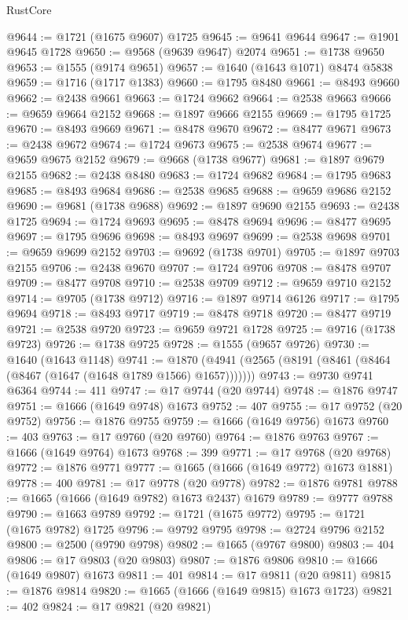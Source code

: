 \begin{lexlean}{RustCore}
\begin{coremodule}
@9644 := @1721 (@1675 @9607) @1725
@9645 := @9641 @9644
@9647 := @1901 @9645 @1728
@9650 := @9568 (@9639 @9647) @2074
@9651 := @1738 @9650
@9653 := @1555 (@9174 @9651)
@9657 := @1640 (@1643 @1071) @8474 @5838
@9659 := @1716 (@1717 @1383)
@9660 := @1795 @8480
@9661 := @8493 @9660
@9662 := @2438 @9661
@9663 := @1724 @9662
@9664 := @2538 @9663
@9666 := @9659 @9664 @2152
@9668 := @1897 @9666 @2155
@9669 := @1795 @1725
@9670 := @8493 @9669
@9671 := @8478 @9670
@9672 := @8477 @9671
@9673 := @2438 @9672
@9674 := @1724 @9673
@9675 := @2538 @9674
@9677 := @9659 @9675 @2152
@9679 := @9668 (@1738 @9677)
@9681 := @1897 @9679 @2155
@9682 := @2438 @8480
@9683 := @1724 @9682
@9684 := @1795 @9683
@9685 := @8493 @9684
@9686 := @2538 @9685
@9688 := @9659 @9686 @2152
@9690 := @9681 (@1738 @9688)
@9692 := @1897 @9690 @2155
@9693 := @2438 @1725
@9694 := @1724 @9693
@9695 := @8478 @9694
@9696 := @8477 @9695
@9697 := @1795 @9696
@9698 := @8493 @9697
@9699 := @2538 @9698
@9701 := @9659 @9699 @2152
@9703 := @9692 (@1738 @9701)
@9705 := @1897 @9703 @2155
@9706 := @2438 @9670
@9707 := @1724 @9706
@9708 := @8478 @9707
@9709 := @8477 @9708
@9710 := @2538 @9709
@9712 := @9659 @9710 @2152
@9714 := @9705 (@1738 @9712)
@9716 := @1897 @9714 @6126
@9717 := @1795 @9694
@9718 := @8493 @9717
@9719 := @8478 @9718
@9720 := @8477 @9719
@9721 := @2538 @9720
@9723 := @9659 @9721 @1728
@9725 := @9716 (@1738 @9723)
@9726 := @1738 @9725
@9728 := @1555 (@9657 @9726)
@9730 := @1640 (@1643 @1148)
@9741 := @1870 (@4941 (@2565 (@8191 (@8461 (@8464 (@8467 (@1647 (@1648 @1789 @1566) @1657)))))))
@9743 := @9730 @9741 @6364
@9744 := 411
@9747 := @17 @9744 (@20 @9744)
@9748 := @1876 @9747
@9751 := @1666 (@1649 @9748) @1673
@9752 := 407
@9755 := @17 @9752 (@20 @9752)
@9756 := @1876 @9755
@9759 := @1666 (@1649 @9756) @1673
@9760 := 403
@9763 := @17 @9760 (@20 @9760)
@9764 := @1876 @9763
@9767 := @1666 (@1649 @9764) @1673
@9768 := 399
@9771 := @17 @9768 (@20 @9768)
@9772 := @1876 @9771
@9777 := @1665 (@1666 (@1649 @9772) @1673 @1881)
@9778 := 400
@9781 := @17 @9778 (@20 @9778)
@9782 := @1876 @9781
@9788 := @1665 (@1666 (@1649 @9782) @1673 @2437) @1679
@9789 := @9777 @9788
@9790 := @1663 @9789
@9792 := @1721 (@1675 @9772)
@9795 := @1721 (@1675 @9782) @1725
@9796 := @9792 @9795
@9798 := @2724 @9796 @2152
@9800 := @2500 (@9790 @9798)
@9802 := @1665 (@9767 @9800)
@9803 := 404
@9806 := @17 @9803 (@20 @9803)
@9807 := @1876 @9806
@9810 := @1666 (@1649 @9807) @1673
@9811 := 401
@9814 := @17 @9811 (@20 @9811)
@9815 := @1876 @9814
@9820 := @1665 (@1666 (@1649 @9815) @1673 @1723)
@9821 := 402
@9824 := @17 @9821 (@20 @9821)

\end{coremodule}
\end{lexlean}
